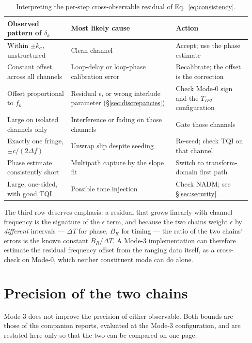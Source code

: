 \documentclass[11pt,a4paper]{article}
\newcommand{\TQI}{\mathrm{TQI}}
\newcommand{\NADM}{\mathrm{NADM}}
\newcommand{\Tipthree}{T_{IP2}}
\begin{document}
\begin{table}[h]
\caption{Interpreting the per-step cross-observable residual of Eq.~\eqref{eq:consistency}.}
\label{tab:residual}
\centering\small
\begin{tabular}{@{}L{40mm}L{44mm}L{44mm}@{}}
\toprule
Observed pattern of $\delta_k$ & Most likely cause & Action \\
\midrule
Within $\pm k_\sigma$, unstructured & Clean channel & Accept; use the phase estimate \\
Constant offset across all channels & Loop-delay or loop-phase calibration error & Recalibrate; the offset is the correction \\
Offset proportional to $f_k$ & Residual $\epsilon$, or wrong interlude parameter (\S\ref{sec:discrepancies}) & Check Mode-0 sign and the $\Tipthree$ configuration \\
Large on isolated channels only & Interference or fading on those channels & Gate those channels \\
Exactly one fringe, $\pm c/(2\Delta f)$ & Unwrap slip despite seeding & Re-seed; check $\TQI$ on that channel \\
Phase estimate consistently short & Multipath capture by the slope fit & Switch to transform-domain first path \\
Large, one-sided, with good $\TQI$ & Possible tone injection & Check $\NADM$; see \S\ref{sec:security} \\
\bottomrule
\end{tabular}
\end{table}

The third row deserves emphasis: a residual that grows linearly with channel frequency is the
signature of the $\epsilon$ term, and because the two chains weight $\epsilon$ by \emph{different}
intervals --- $\Delta T$ for phase, $B_R$ for timing --- the ratio of the two chains' errors is the
known constant $B_R/\Delta T$. A Mode-3 implementation can therefore estimate the residual frequency
offset from the ranging data itself, as a cross-check on Mode-0, which neither constituent mode can
do alone.
\section{Precision of the two chains}
\label{sec:precision}

Mode-3 does not improve the precision of either observable. Both bounds are those of the companion
reports, evaluated at the Mode-3 configuration, and are restated here only so that the two can be
compared on one page.
\end{document}

